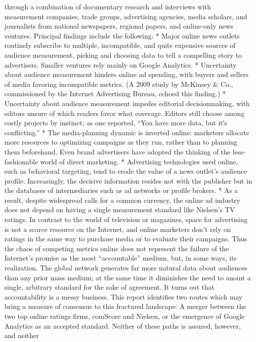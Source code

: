 through a combination of documentary research and interviews with
measurement companies, trade groups, advertising agencies, media
scholars, and journalists from national newspapers, regional papers, and
online‐only news ventures. Principal findings include the following:
* Major online news outlets routinely subscribe to multiple, incompatible,
and quite expensive sources of audience measurement, picking and
choosing data to tell a compelling story to advertisers. Smaller ventures
rely mainly on Google Analytics.
* Uncertainty about audience measurement hinders online ad spending,
with buyers and sellers of media favoring incompatible metrics. (A 2009
study by McKinsey & Co., commissioned by the Internet Advertising
Bureau, echoed this finding.)
* Uncertainty about audience measurement impedes editorial decisionmaking,
with editors unsure of which readers favor what coverage.
Editors still choose among costly projects by instinct; as one reported,
``You have more data, but itʹs conflicting.''
* The media‐planning dynamic is inverted online: marketers allocate more
resources to optimizing campaigns as they run, rather than to planning
them beforehand. Even brand advertisers have adopted the thinking of
the less‐fashionable world of direct marketing.
* Advertising technologies used online, such as behavioral targeting, tend
to erode the value of a news outlet’s audience profile. Increasingly, the
decisive information resides not with the publisher but in the databases of
intermediaries such as ad networks or profile brokers.
* As a result, despite widespread calls for a common currency, the online
ad industry does not depend on having a single measurement standard
like Nielsen’s TV ratings. In contrast to the world of television or
magazines, space for advertising is not a scarce resource on the Internet,
and online marketers don’t rely on ratings in the same way to purchase
media or to evaluate their campaigns.
Thus the chaos of competing metrics online does not represent the failure
of the Internet’s promise as the most ``accountable'' medium, but, in some
ways, its realization. The global network generates far more natural data
about audiences than any prior mass medium; at the same time it
diminishes the need to anoint a single, arbitrary standard for the sake of
agreement. It turns out that accountability is a messy business.
This report identifies two routes which may bring a measure of consensus
to this fractured landscape: A merger between the two top online ratings
firms, comScore and Nielsen, or the emergence of Google Analytics as an
accepted standard. Neither of these paths is assured, however, and neither
